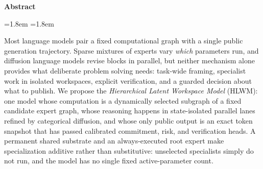\documentclass[10pt,a4paper]{article}
\begin{document}
\begin{center}\textbf{Abstract}\end{center}
\begin{list}{}{\leftmargin=1.8em \rightmargin=1.8em}\item\relax
\small
Most language models pair a fixed computational graph with a single public
generation trajectory. Sparse mixtures of experts vary \emph{which} parameters
run, and diffusion language models revise blocks in parallel, but neither
mechanism alone provides what deliberate problem solving needs: task-wide
framing, specialist work in isolated workspaces, explicit verification, and a
guarded decision about what to publish. We propose the \emph{Hierarchical
Latent Workspace Model} (HLWM): one model whose computation is a dynamically
selected subgraph of a fixed candidate expert graph, whose reasoning happens in
state-isolated parallel lanes refined by categorical diffusion, and whose only
public output is an exact token snapshot that has passed calibrated
commitment, risk, and verification heads. A permanent shared substrate and an
always-executed root expert make specialization additive rather than
substitutive: unselected specialists simply do not run, and the model has no
single fixed active-parameter count.


\end{list}
\end{document}
